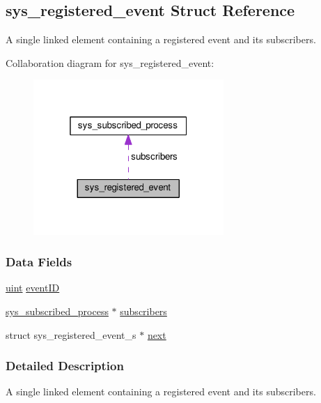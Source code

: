 \hypertarget{structsys__registered__event}{}\subsection{sys\+\_\+registered\+\_\+event Struct Reference}
\label{structsys__registered__event}


A single linked element containing a registered event and its subscribers.  




Collaboration diagram for sys\+\_\+registered\+\_\+event\+:\nopagebreak
\begin{figure}[H]
\begin{center}
\leavevmode
\includegraphics[width=205pt]{d3/df0/structsys__registered__event__coll__graph}
\end{center}
\end{figure}
\subsubsection*{Data Fields}
\begin{DoxyCompactItemize}
\item 
\hyperlink{definitions_8h_a1445ebbbf93d62972255ec5e89a5ab01}{uint} \hyperlink{structsys__registered__event_a2a51dcccee68f255abf32bc3feb584f4}{event\+I\+D}
\item 
\hyperlink{structsys__subscribed__process}{sys\+\_\+subscribed\+\_\+process} $\ast$ \hyperlink{structsys__registered__event_a05b146034143e4b7998e265c41e8dea6}{subscribers}
\item 
struct sys\+\_\+registered\+\_\+event\+\_\+s $\ast$ \hyperlink{structsys__registered__event_acbd46e5730440d227197def0c9e51a79}{next}
\end{DoxyCompactItemize}


\subsubsection{Detailed Description}
A single linked element containing a registered event and its subscribers. 

